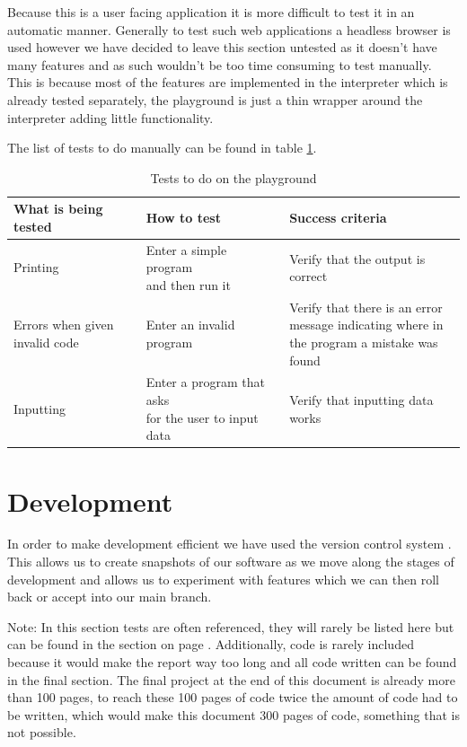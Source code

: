 \documentclass{article}
\begin{document}
Because this is a user facing application it is more difficult to test it in an
automatic manner. Generally to test such web applications a headless browser is
used however we have decided to leave this section untested as it doesn't have
many features and as such wouldn't be too time consuming to test manually. This
is because most of the features are implemented in the interpreter which is
already tested separately, the playground is just a thin wrapper around the
interpreter adding little functionality.

The list of tests to do manually can be found in table
\ref{tbl:playground_tests}.

\begin{table}
	\begin{adjustbox}{center}
	\begin{tabular}{|l|l|l|}
		\hline
		What is being tested & How to test & Success criteria \\
		\hline
		Printing & \makecell[ll]{Enter a simple program \\ and then run it} & Verify that the
		output is correct \\
		\hline
		\makecell[ll]{Errors when given \\ invalid code} & Enter an invalid program &
		\makecell[ll]{Verify that there is an error \\ message indicating where
		in \\ the program a mistake was found} \\
		\hline
		Inputting & \makecell[ll]{Enter a program that asks \\ for the user to
		input data} &
		Verify that inputting data works \\
		\hline
	\end{tabular}
	\end{adjustbox}
	\caption{Tests to do on the playground}
	\label{tbl:playground_tests}
\end{table}

\section{Development}

In order to make development efficient we have used the version control system
. This allows us to create snapshots of our software as we move
along the stages of development and allows us to experiment with features which
we can then roll back or accept into our main branch.

Note: In this section tests are often referenced, they will rarely be listed
here but can be found in the section  on page
\pageref{sec:final_project}. Additionally, code is rarely included because it
would make the report way too long and all code written can be found in the
final section. The final project at the end of this document is already more
than 100 pages, to reach these 100 pages of code twice the amount of code had
to be written, which would make this document 300 pages of code, something that
is not possible.
\end{document}
